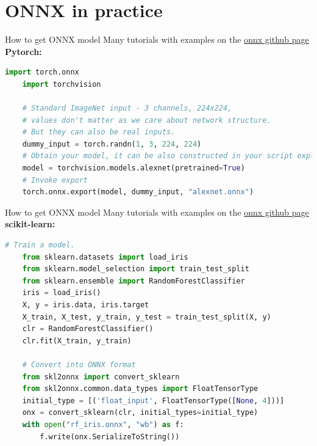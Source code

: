 \documentclass[aspectratio=169,9pt]{beamer}
\begin{document}
\section{ONNX in practice}
\begin{frame}[t,fragile]{How to get ONNX model}
  Many tutorials with examples on the \href{https://github.com/onnx/tutorials\#converting-to-onnx-format}{\color{blue}onnx github page}\\
  \vspace*{1em}
  \textbf{Pytorch:}
  \begin{lstlisting}[language=Python]
    import torch.onnx
    import torchvision
    
    # Standard ImageNet input - 3 channels, 224x224,
    # values don't matter as we care about network structure.
    # But they can also be real inputs.
    dummy_input = torch.randn(1, 3, 224, 224)
    # Obtain your model, it can be also constructed in your script explicitly
    model = torchvision.models.alexnet(pretrained=True)
    # Invoke export
    torch.onnx.export(model, dummy_input, "alexnet.onnx")    
  \end{lstlisting}
\end{frame}


\begin{frame}[t,fragile]{How to get ONNX model}
  Many tutorials with examples on the \href{https://github.com/onnx/tutorials\#converting-to-onnx-format}{\color{blue}onnx github page}\\
  \vspace*{1em}
  \textbf{scikit-learn:}
  \begin{lstlisting}[language=Python]
    # Train a model.
    from sklearn.datasets import load_iris
    from sklearn.model_selection import train_test_split
    from sklearn.ensemble import RandomForestClassifier
    iris = load_iris()
    X, y = iris.data, iris.target
    X_train, X_test, y_train, y_test = train_test_split(X, y)
    clr = RandomForestClassifier()
    clr.fit(X_train, y_train)
    
    # Convert into ONNX format
    from skl2onnx import convert_sklearn
    from skl2onnx.common.data_types import FloatTensorType
    initial_type = [('float_input', FloatTensorType([None, 4]))]
    onx = convert_sklearn(clr, initial_types=initial_type)
    with open("rf_iris.onnx", "wb") as f:
        f.write(onx.SerializeToString())
  \end{lstlisting}
\end{frame}
\end{document}
